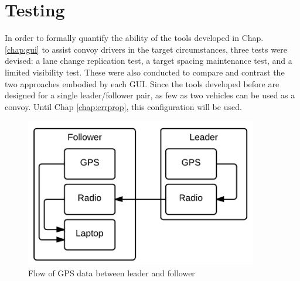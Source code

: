 \section{Testing} \label{sec:test}
In order to formally quantify the ability of the tools developed in Chap. \ref{chap:gui} to assist convoy drivers in the target circumstances, three tests were devised: a lane change replication test, a target spacing maintenance test, and a limited visibility test. These were also conducted to compare and contrast the two approaches embodied by each GUI. Since the tools developed before are designed for a single leader/follower pair, as few as two vehicles can be used as a convoy.
Until Chap \ref{chap:errprop}, this configuration will be used.

\begin{figure}[ht] \centering
    \includegraphics[width=4in]{./figs/hardware_flow.png}
    \caption{Flow of GPS data between leader and follower} \label{fig:hardwareflow}
\end{figure}

